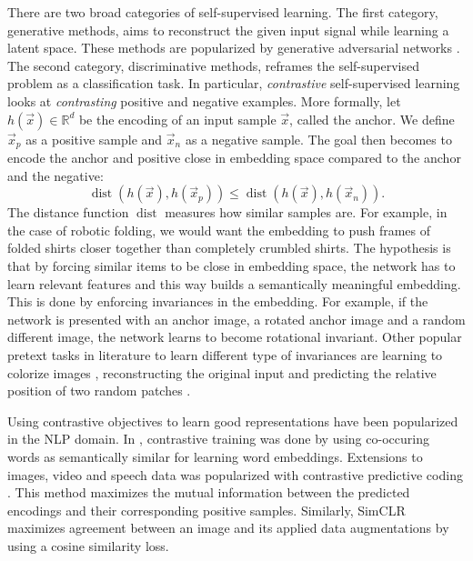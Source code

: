 \documentclass[\home/main.tex]{subfiles}
\begin{document}
There are two broad categories of self-supervised learning. The first category, generative methods, aims to reconstruct the given input signal while learning a latent space. These methods are popularized by generative adversarial networks \autocite{goodfellow2014generative}. The second category, discriminative methods, reframes the self-supervised problem as a classification task. In particular, \emph{contrastive} self-supervised learning looks at \textit{contrasting} positive and negative examples. More formally, let \( h( \vec{x} ) \in \mathbb{R}^d \) be the encoding of an input sample \( \vec{x} \), called the anchor. We define \( \vec{x}_p \) as a positive sample and \( \vec{x}_n \) as a negative sample. The goal then becomes to encode the anchor and positive close in embedding space compared to the anchor and the negative:
\begin{equation*}
	\operatorname{dist}{\left( h(\vec{x}),h(\vec{x}_p) \right)} \leq \operatorname{dist}{\left( h(\vec{x}),h(\vec{x}_n) \right)} .
\end{equation*}
The distance function $\operatorname{dist}{}$ measures how similar samples are. For example, in the case of robotic folding, we would want the embedding to push frames of folded shirts closer together than completely crumbled shirts. The hypothesis is that by forcing similar items to be close in embedding space, the network has to learn relevant features and this way builds a semantically meaningful embedding. This is done by enforcing invariances in the embedding. For example, if the network is presented with an anchor image, a rotated anchor image and a random different image, the network learns to become rotational invariant. Other popular pretext tasks in literature to learn different type of invariances are learning to colorize images \autocite{Zhang2016Color}, reconstructing the original input \autocite{Pathak2016} and predicting the relative position of two random patches \autocite{Doersch2015}.


Using contrastive objectives to learn good representations have been popularized in the NLP domain. In \autocite{mikolov2013distributed}, contrastive training was done by using co-occuring words as semantically similar for learning word embeddings. Extensions to images, video and speech data was popularized with contrastive predictive coding \autocite{oord2018representation}. This method maximizes the mutual information between the predicted encodings and their corresponding positive samples. Similarly, SimCLR \autocite{chen2020simple} maximizes agreement between an image and its applied data augmentations by using a cosine similarity loss.
\end{document}
